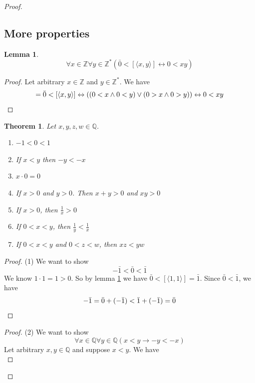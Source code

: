 \documentclass{report}
\newtheorem{theorem}[theo]{Theorem}
\newtheorem{lemma}[theo]{Lemma}
\begin{document}
\begin{proof}
\subsection{More properties}
\begin{lemma}\label{Q_>0_lemma}
\begin{equation*}
\forall x\in\mathbb Z\forall y\in\mathbb Z^*(\bar0<[\langle x,y\rangle]\leftrightarrow0<xy)
\end{equation*}
\end{lemma}
\begin{proof}
Let arbitrary $x\in\mathbb Z$ and $y\in\mathbb Z^*$. We have
\begin{equation*}
[\langle 0,1\rangle]=\bar0<[\langle x,y\rangle]\leftrightarrow((0<x\land 0<y)\lor(0>x\land 0>y))\leftrightarrow0<xy\qedhere
\end{equation*}
\end{proof}
\begin{theorem}
Let $x,y,z,w\in\mathbb Q$.
\begin{enumerate}
\item $-1<0<1$
\item If $x<y$ then $-y<-x$
\item $x\cdot0=0$
\item If $x>0$ and $y>0$. Then $x+y>0$ and $xy>0$
\item If $x>0$, then $\frac{1}{x}>0$
\item If $0<x<y$, then $\frac{1}{y}<\frac{1}{x}$
\item If $0<x<y$ and $0<z<w$, then $xz<yw$
\end{enumerate}
\end{theorem}
\begin{proof}(1)
We want to show
\begin{equation*}
-\bar1<\bar0<\bar1
\end{equation*}
We know $1\cdot1=1>0$. So by lemma \ref{Q_>0_lemma} we have $\bar0<[\langle 1,1\rangle]=\bar1$. Since $\bar0<\bar1$, we have
\begin{equation*}
-\bar1=\bar0+(-\bar1)<\bar1+(-\bar1)=\bar0\qedhere
\end{equation*}
\end{proof}
\begin{proof}(2)
We want to show
\begin{equation*}
\forall x\in\mathbb Q\forall y\in\mathbb Q(x<y\to-y<-x)
\end{equation*}
Let arbitrary $x,y\in\mathbb Q$ and suppose $x<y$.
We have
\begin{equation*}

\end{equation*}
\end{proof}
\end{proof}
\end{document}
